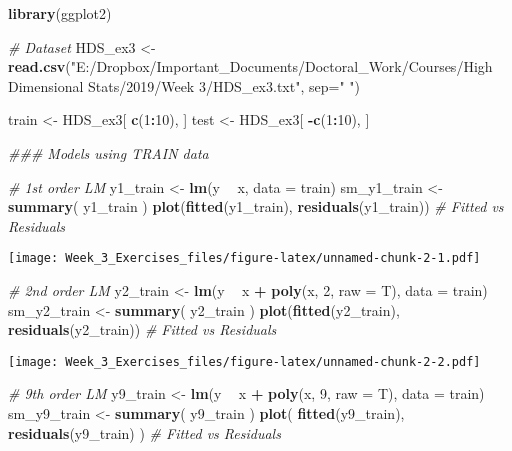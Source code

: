 \documentclass[]{article}
\newenvironment{Shaded}{\begin{snugshade}}{\end{snugshade}}
\newcommand{\CommentTok}[1]{\textcolor[rgb]{0.56,0.35,0.01}{\textit{#1}}}
\newcommand{\DataTypeTok}[1]{\textcolor[rgb]{0.13,0.29,0.53}{#1}}
\newcommand{\DecValTok}[1]{\textcolor[rgb]{0.00,0.00,0.81}{#1}}
\newcommand{\KeywordTok}[1]{\textcolor[rgb]{0.13,0.29,0.53}{\textbf{#1}}}
\newcommand{\NormalTok}[1]{#1}
\newcommand{\OperatorTok}[1]{\textcolor[rgb]{0.81,0.36,0.00}{\textbf{#1}}}
\newcommand{\StringTok}[1]{\textcolor[rgb]{0.31,0.60,0.02}{#1}}
\begin{document}
\begin{Shaded}
\begin{Highlighting}[]
\KeywordTok{library}\NormalTok{(ggplot2)}

\CommentTok{# Dataset}
\NormalTok{HDS_ex3 <-}\StringTok{ }\KeywordTok{read.csv}\NormalTok{(}\StringTok{"E:/Dropbox/Important_Documents/Doctoral_Work/Courses/High Dimensional Stats/2019/Week 3/HDS_ex3.txt"}\NormalTok{, }\DataTypeTok{sep=}\StringTok{" "}\NormalTok{)}

\NormalTok{train <-}\StringTok{ }\NormalTok{HDS_ex3[ }\KeywordTok{c}\NormalTok{(}\DecValTok{1}\OperatorTok{:}\DecValTok{10}\NormalTok{), ]}
\NormalTok{test <-}\StringTok{ }\NormalTok{HDS_ex3[ }\OperatorTok{-}\KeywordTok{c}\NormalTok{(}\DecValTok{1}\OperatorTok{:}\DecValTok{10}\NormalTok{), ]}

\CommentTok{### Models using TRAIN data}

\CommentTok{# 1st order LM}
\NormalTok{y1_train <-}\StringTok{ }\KeywordTok{lm}\NormalTok{(y }\OperatorTok{~}\StringTok{ }\NormalTok{x, }\DataTypeTok{data =}\NormalTok{ train)}
\NormalTok{sm_y1_train <-}\StringTok{ }\KeywordTok{summary}\NormalTok{( y1_train )}
\KeywordTok{plot}\NormalTok{(}\KeywordTok{fitted}\NormalTok{(y1_train), }\KeywordTok{residuals}\NormalTok{(y1_train)) }\CommentTok{# Fitted vs Residuals}
\end{Highlighting}
\end{Shaded}

\texttt{[image: Week\_3\_Exercises\_files/figure-latex/unnamed-chunk-2-1.pdf]}

\begin{Shaded}
\begin{Highlighting}[]
\CommentTok{# 2nd order LM}
\NormalTok{y2_train <-}\StringTok{ }\KeywordTok{lm}\NormalTok{(y }\OperatorTok{~}\StringTok{ }\NormalTok{x }\OperatorTok{+}\StringTok{ }\KeywordTok{poly}\NormalTok{(x, }\DecValTok{2}\NormalTok{, }\DataTypeTok{raw =}\NormalTok{ T), }\DataTypeTok{data =}\NormalTok{ train)}
\NormalTok{sm_y2_train <-}\StringTok{ }\KeywordTok{summary}\NormalTok{( y2_train )}
\KeywordTok{plot}\NormalTok{(}\KeywordTok{fitted}\NormalTok{(y2_train), }\KeywordTok{residuals}\NormalTok{(y2_train)) }\CommentTok{# Fitted vs Residuals}
\end{Highlighting}
\end{Shaded}

\texttt{[image: Week\_3\_Exercises\_files/figure-latex/unnamed-chunk-2-2.pdf]}

\begin{Shaded}
\begin{Highlighting}[]
\CommentTok{# 9th order LM}
\NormalTok{y9_train <-}\StringTok{ }\KeywordTok{lm}\NormalTok{(y }\OperatorTok{~}\StringTok{ }\NormalTok{x }\OperatorTok{+}\StringTok{ }\KeywordTok{poly}\NormalTok{(x, }\DecValTok{9}\NormalTok{, }\DataTypeTok{raw =}\NormalTok{ T), }\DataTypeTok{data =}\NormalTok{ train)}
\NormalTok{sm_y9_train <-}\StringTok{ }\KeywordTok{summary}\NormalTok{( y9_train )}
\KeywordTok{plot}\NormalTok{( }\KeywordTok{fitted}\NormalTok{(y9_train), }\KeywordTok{residuals}\NormalTok{(y9_train) ) }\CommentTok{# Fitted vs Residuals}
\end{Highlighting}
\end{Shaded}
\end{document}

